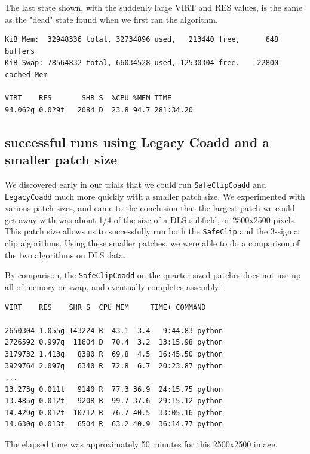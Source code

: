 \documentclass[modern]{aastex61}
\begin{document}
The last state shown, with the suddenly large VIRT and RES values, is the same as the "dead" state found when we first ran the algorithm.

\begin{small}
\begin{verbatim}
KiB Mem:  32948336 total, 32734896 used,   213440 free,      648 buffers
KiB Swap: 78564832 total, 66034528 used, 12530304 free.    22800 cached Mem

VIRT    RES       SHR S  %CPU %MEM TIME                                               
94.062g 0.029t   2084 D  23.8 94.7 281:34.20
\end{verbatim}
\end{small}

\subsection{successful runs using Legacy Coadd and a smaller patch size}
We discovered early in our trials that we could run {\tt\string SafeClipCoadd} and {\tt\string LegacyCoadd} much more quickly with a smaller patch size. We experimented with various patch sizes, and came to the conclusion that the largest patch we could get away with was about 1/4 of the size of a DLS subfield, or 2500x2500 pixels. This patch size allows us to successfully run both the {\tt\string SafeClip} and the 3-sigma clip algorithms. Using these smaller patches, we were able to do a comparison of the two algorithms on DLS data.

By comparison, the {\tt\string SafeClipCoadd} on the quarter sized patches does not use up all of memory or swap, and eventually completes assembly:
\begin{small}
\begin{verbatim}
VIRT    RES    SHR S  CPU MEM     TIME+ COMMAND

2650304 1.055g 143224 R  43.1  3.4   9:44.83 python                                       
2726592 0.997g  11604 D  70.4  3.2  13:15.98 python                                       
3179732 1.413g   8380 R  69.8  4.5  16:45.50 python                                       
3929764 2.097g   6340 R  72.8  6.7  20:23.87 python                                       
...
13.273g 0.011t   9140 R  77.3 36.9  24:15.75 python                                       
13.485g 0.012t   9208 R  99.7 37.6  29:15.12 python                                       
14.429g 0.012t  10712 R  76.7 40.5  33:05.16 python                                       
14.630g 0.013t   6504 R  63.2 40.9  36:14.77 python
\end{verbatim}
\end{small}
The elapsed time was approximately 50 minutes for this 2500x2500 image.
\end{document}
